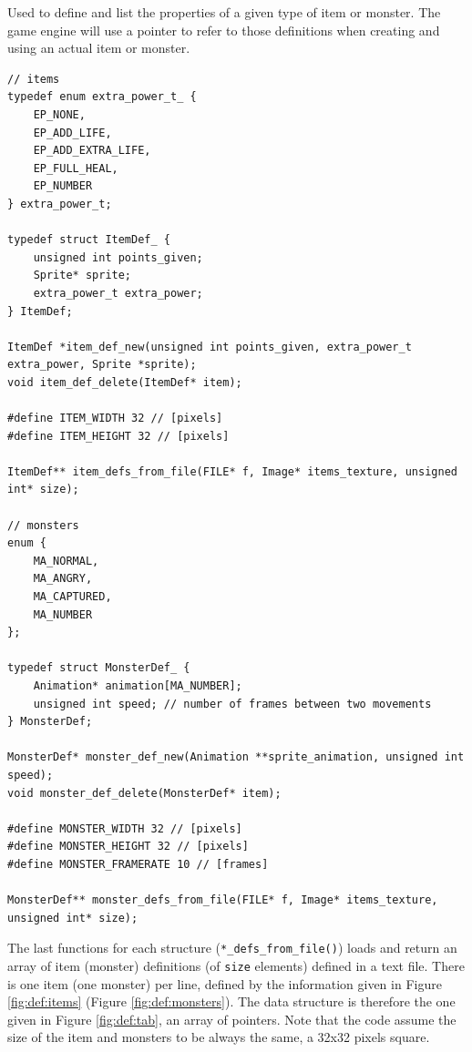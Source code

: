 \documentclass[12pt,a4paper]{article}
\newcommand{\cc}[1]{\texttt{#1}}
\begin{document}
Used to define and list the properties of a given type of item or monster. The game engine will use a pointer to refer to those definitions when creating and using an actual item or monster.

\begin{verbatim}
// items
typedef enum extra_power_t_ {
	EP_NONE,
	EP_ADD_LIFE,
	EP_ADD_EXTRA_LIFE,
	EP_FULL_HEAL,
	EP_NUMBER
} extra_power_t;

typedef struct ItemDef_ {
	unsigned int points_given;
	Sprite* sprite;
	extra_power_t extra_power;
} ItemDef;

ItemDef *item_def_new(unsigned int points_given, extra_power_t extra_power, Sprite *sprite);
void item_def_delete(ItemDef* item);

#define ITEM_WIDTH 32 // [pixels]
#define ITEM_HEIGHT 32 // [pixels]

ItemDef** item_defs_from_file(FILE* f, Image* items_texture, unsigned int* size);

// monsters
enum {
    MA_NORMAL,
    MA_ANGRY,
    MA_CAPTURED,
    MA_NUMBER
};

typedef struct MonsterDef_ {
	Animation* animation[MA_NUMBER];
	unsigned int speed; // number of frames between two movements
} MonsterDef;

MonsterDef* monster_def_new(Animation **sprite_animation, unsigned int speed);
void monster_def_delete(MonsterDef* item);

#define MONSTER_WIDTH 32 // [pixels]
#define MONSTER_HEIGHT 32 // [pixels]
#define MONSTER_FRAMERATE 10 // [frames]

MonsterDef** monster_defs_from_file(FILE* f, Image* items_texture, unsigned int* size);
\end{verbatim}


The last functions for each structure (\cc{*_defs_from_file()}) loads and return an array of item (monster) definitions (of \cc{size} elements) defined in a text file. There is one item (one monster) per line, defined by the information given in Figure \ref{fig:def:items} (Figure \ref{fig:def:monsters}). The data structure is therefore the one given in Figure \ref{fig:def:tab}, an array of pointers. Note that the code assume the size of the item and monsters to be always the same, a 32x32 pixels square.
\end{document}
